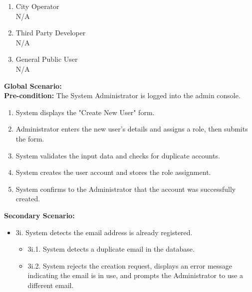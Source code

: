 {\begin{enumerate}[{\bf BE1.}]
\begin{enumerate}[{\bf VP1.}]
            {\bf Secondary Scenario:}
            \begin{itemize}
                \item[] {4i.} System detects the email address is already registered.
                \begin{itemize}
                    \item[] {4i.1.} System detects a duplicate email in the database.
                    \item[] {4i.2.} System rejects the creation request, displays an error message indicating the email is in use, and prompts the Administrator to use a different email or edit the existing user.
                \end{itemize}
            \end{itemize}
        \item City Operator \\ N/A
        \item {Third Party Developer} \\ N/A
        \item General Public User \\ N/A
    \end{enumerate}
    {\bf Global Scenario:} \\
    {\bf Pre-condition:} The System Administrator is logged into the admin console.
        \begin{enumerate}[1. ]
            \item System displays the "Create New User" form.
            \item Administrator enters the new user's details and assigns a role, then submits the form.
            \item System validates the input data and checks for duplicate accounts.
            \item System creates the user account and stores the role assignment.
            \item System confirms to the Administrator that the account was successfully created.
        \end{enumerate}

    {\bf Secondary Scenario:}
        \begin{itemize}
            \item[] {3i.} System detects the email address is already registered.
            \begin{itemize}
                \item[] {3i.1.} System detects a duplicate email in the database.
                \item[] {3i.2.} System rejects the creation request, displays an error message indicating the email is in use, and prompts the Administrator to use a different email.
            \end{itemize}
        \end{itemize}

\end{enumerate}
}
